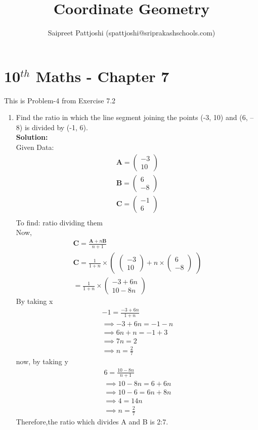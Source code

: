 \documentclass[10pt]{article}
\title{Coordinate Geometry}
\author{Saipreet Pattjoshi (spattjoshi@sriprakashschools.com)}
\newcommand{\myvec}[1]{\ensuremath{\begin{pmatrix}#1\end{pmatrix}}}
\newcommand{\solution}{\noindent \textbf{Solution: }}
\let\vec\mathbf
\begin{document}
\maketitle
\section*{10$^{th}$ Maths - Chapter 7}
This is Problem-4 from Exercise 7.2
\begin{enumerate}
\item  Find the ratio in which the line segment joining the points (-3, 10) and (6, – 8) is divided by (-1, 6).  \\
\solution \\
Given Data:\\
\begin{align}
           \vec{A} = \myvec{-3\\10}\\
           \vec{B} = \myvec{6\\-8}\\
           \vec{C} = \myvec{-1\\6}\\
           \end{align}
To find: ratio dividing them\\
Now, 
\begin{align}
\vec{C} = \frac{\vec{A}+n\vec{B}}{n+1}\\
\vec{C} = \frac{1}{1+n} \times \myvec{\myvec{-3\\10}+n\times \myvec{6\\-8}}\\
= \frac{1}{1+n} \times \myvec{-3+6n\\10-8n}
\end{align}
By taking x
\begin{align}
-1= \frac{-3+6n}{1+n}\\
\implies -3+6n=-1-n\\
\implies 6n+n =-1+3\\
 \implies 7n=2\\
 \implies n=\frac{2}{7}
\end{align}	
now, by taking y 
\begin{align}
6= \frac{10-8n}{n+1}\\
\implies 10-8n=6+6n\\
\implies 10-6=6n+8n\\
\implies 4=14n\\
\implies n=\frac{2}{7}
\end{align}
Therefore,the ratio which divides A and B is 2:7.\\
\end{enumerate}
\end{document}
